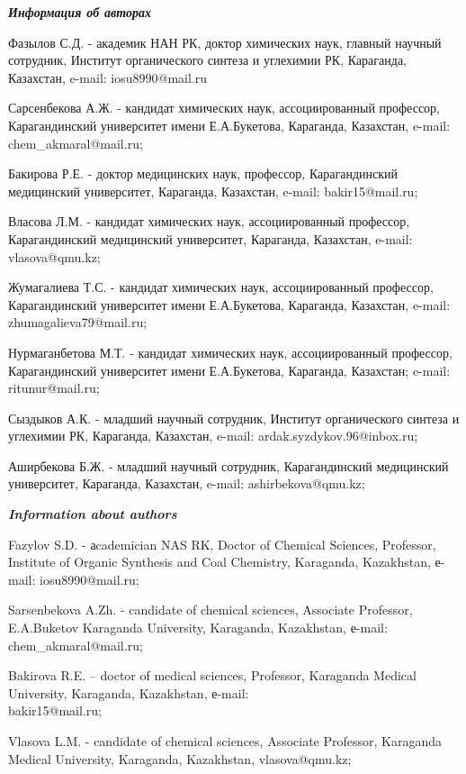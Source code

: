 \begin{info}
\emph{{\bfseries Информация об авторах}}

Фазылов С.Д. - академик НАН РК, доктор химических наук, главный научный
сотрудник, Институт органического синтеза и углехимии РК, Караганда,
Казахстан, e-mail:
iosu8990@mail.ru

Сарсенбекова А.Ж. - кандидат химических наук, ассоциированный профессор,
Карагандинский университет имени Е.А.Букетова, Караганда, Казахстан,
e-mail:
chem\_akmaral@mail.ru;

Бакирова Р.Е. - доктор медицинских наук, профессор, Карагандинский
медицинский университет, Караганда, Казахстан, e-mail:
bakir15@mail.ru;

Власова Л.М. - кандидат химических наук, ассоциированный профессор,
Карагандинский медицинский университет, Караганда, Казахстан, e-mail:
vlasova@qmu.kz;

Жумагалиева Т.С. - кандидат химических наук, ассоциированный профессор,
Карагандинский университет имени Е.А.Букетова, Караганда, Казахстан,
e-mail: zhumagalieva79@mail.ru;

Нурмаганбетова М.Т. - кандидат химических наук, ассоциированный
профессор, Карагандинский университет имени Е.А.Букетова, Караганда,
Казахстан; e-mail:
ritunur@mail.ru;

Сыздыков А.К. - младший научный сотрудник, Институт органического
синтеза и углехимии РК, Караганда, Казахстан, e-mail:
ardak.syzdykov.96@inbox.ru;

Аширбекова Б.Ж. - младший научный сотрудник, Карагандинский медицинский
университет, Караганда, Казахстан, e-mail:
ashirbekova@qmu.kz;

\emph{{\bfseries Information about authors}}

Fazylov S.D. - аcademician NAS RK, Doctor of Chemical Sciences,
Professor, Institute of Organic Synthesis and Coal Chemistry, Karaganda,
Kazakhstan, е-mail:
iosu8990@mail.ru;

Sarsenbekova A.Zh. - candidate of chemical sciences, Associate
Professor, E.A.Buketov Karaganda University, Karaganda, Kazakhstan,
е-mail:
chem\_akmaral@mail.ru;

Bakirova R.E. -- doctor of medical sciences, Professor, Karaganda
Medical University, Karaganda, Kazakhstan, е-mail:\\
bakir15@mail.ru;

Vlasova L.M. - candidate of chemical sciences, Associate Professor,
Karaganda Medical University, Karaganda, Kazakhstan,
vlasova@qmu.kz;


\end{info}
